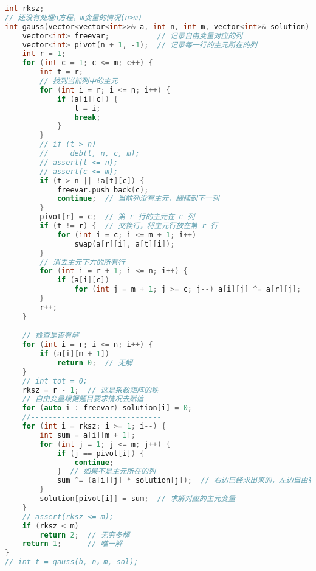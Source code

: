 \begin{lstlisting}[language=C++]
int rksz;
// 还没有处理n方程，m变量的情况(n>m)
int gauss(vector<vector<int>>& a, int n, int m, vector<int>& solution) {
    vector<int> freevar;           // 记录自由变量对应的列
    vector<int> pivot(n + 1, -1);  // 记录每一行的主元所在的列
    int r = 1;
    for (int c = 1; c <= m; c++) {
        int t = r;
        // 找到当前列中的主元
        for (int i = r; i <= n; i++) {
            if (a[i][c]) {
                t = i;
                break;
            }
        }
        // if (t > n)
        //     deb(t, n, c, m);
        // assert(t <= n);
        // assert(c <= m);
        if (t > n || !a[t][c]) {
            freevar.push_back(c);
            continue;  // 当前列没有主元，继续到下一列
        }
        pivot[r] = c;  // 第 r 行的主元在 c 列
        if (t != r) {  // 交换行，将主元行放在第 r 行
            for (int i = c; i <= m + 1; i++)
                swap(a[r][i], a[t][i]);
        }
        // 消去主元下方的所有行
        for (int i = r + 1; i <= n; i++) {
            if (a[i][c])
                for (int j = m + 1; j >= c; j--) a[i][j] ^= a[r][j];
        }
        r++;
    }

    // 检查是否有解
    for (int i = r; i <= n; i++) {
        if (a[i][m + 1])
            return 0;  // 无解
    }
    // int tot = 0;
    rksz = r - 1;  // 这是系数矩阵的秩
    // 自由变量根据题目要求情况去赋值
    for (auto i : freevar) solution[i] = 0;
    //------------------------------
    for (int i = rksz; i >= 1; i--) {
        int sum = a[i][m + 1];
        for (int j = 1; j <= m; j++) {
            if (j == pivot[i]) {
                continue;
            }  // 如果不是主元所在的列
            sum ^= (a[i][j] * solution[j]);  // 右边已经求出来的，左边自由变量遗留
        }
        solution[pivot[i]] = sum;  // 求解对应的主元变量
    }
    // assert(rksz <= m);
    if (rksz < m)
        return 2;  // 无穷多解
    return 1;      // 唯一解
}
// int t = gauss(b, n，m, sol);
\end{lstlisting}
